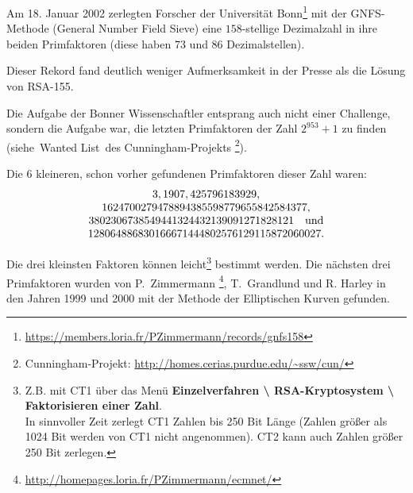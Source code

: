\begin{refsegment}
Am 18. Januar 2002 zerlegten Forscher der Universität Bonn\footnote{%
  \url{https://members.loria.fr/PZimmermann/records/gnfs158}
}
mit der GNFS-Methode (General Number Field Sieve)  eine $158$-stellige Dezimalzahl in ihre beiden Primfaktoren
(diese haben 73 und 86 Dezimalstellen).

Dieser Rekord fand deutlich weniger Aufmerksamkeit in der Presse als die
Lösung von RSA-155.

Die Aufgabe der Bonner Wissenschaftler entsprang auch nicht einer Challenge,
sondern die Aufgabe war, die letzten Primfaktoren der Zahl $2^{953}+1$
zu finden (siehe~\glqq Wanted List\grqq~des Cunningham-Projekts%
\footnote{%
Cunningham-Projekt: \url{http://homes.cerias.purdue.edu/~ssw/cun/}}).

Die 6 kleineren, schon vorher gefundenen Primfaktoren dieser Zahl waren:
$$
\begin{array}{c}
        3, 1907, 425796183929,\\
        1624700279478894385598779655842584377,\\
        3802306738549441324432139091271828121 \quad{\rm und}\\
        128064886830166671444802576129115872060027.
\end{array}
$$
\begin{sloppypar}
Die drei kleinsten Faktoren können leicht\footnote{%
Z.B. mit CT1 über das Menü
\textbf{Einzelverfahren \textbackslash{} RSA-Kryptosystem \textbackslash{}
Faktorisieren einer Zahl}.\\
In sinnvoller Zeit zerlegt CT1 Zahlen bis 250 Bit Länge (Zahlen größer als
1024 Bit werden von CT1 nicht angenommen). CT2 kann auch
Zahlen größer 250 Bit zerlegen.
}
bestimmt werden.
Die nächsten drei Primfaktoren wurden von P.~Zimmermann%
\footnote{\url{http://homepages.loria.fr/PZimmermann/ecmnet/}},
T.~Grandlund und R. Harley in den Jahren 1999 und 2000 mit der Methode
der Elliptischen Kurven gefunden.
\end{sloppypar}


\end{refsegment}
